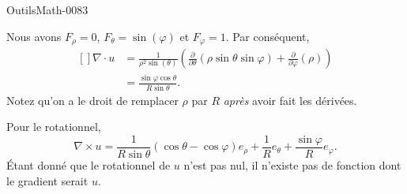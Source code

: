 
\begin{corrige}{OutilsMath-0083}

    Nous avons $F_{\rho}=0$, $F_{\theta}=\sin(\varphi)$ et $F_{\varphi}=1$. Par conséquent,
    \begin{equation}
            \begin{aligned}[]
        \nabla\cdot u&=\frac{1}{ \rho^2\sin(\theta) }\left( \frac{ \partial  }{ \partial \theta }(\rho\sin\theta\sin\varphi)+\frac{ \partial  }{ \partial \varphi }(\rho) \right)\\
        &=\frac{ \sin\varphi\cos\theta }{ R\sin\theta }.
            \end{aligned}
    \end{equation}
    Notez qu'on a le droit de remplacer $\rho$ par $R$ \emph{après} avoir fait les dérivées.

    Pour le rotationnel,
    \begin{equation}
        \nabla\times u=\frac{1}{ R\sin\theta }(\cos\theta-\cos\varphi)e_{\rho}+\frac{1}{ R }e_{\theta}+\frac{ \sin\varphi }{ R }e_{\varphi}.
    \end{equation}
    Étant donné que le rotationnel de $u$ n'est pas nul, il n'existe pas de fonction dont le gradient serait $u$.

\end{corrige}
